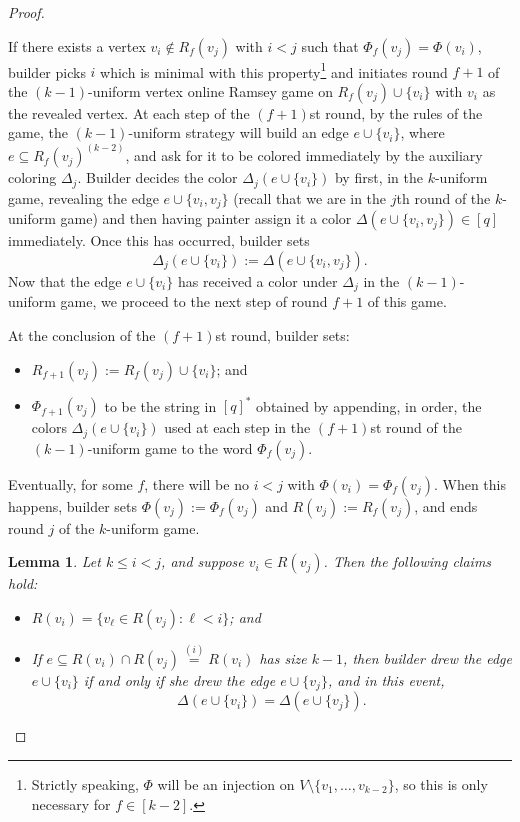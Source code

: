 \documentclass[10pt,a4paper]{amsart}
\newtheorem{lemma}{Lemma}
\def\l{\ell}
\begin{document}
\begin{proof}
\begin{itemize}
    If there exists a vertex $v_i \notin R_f(v_j)$ with $i < j$ such that $\Phi_f(v_j) = \Phi(v_i)$,
    builder picks $i$ which is minimal with this property\footnote{Strictly speaking, $\Phi$ will be an injection on $V \setminus \{v_1, \dots, v_{k-2}\}$, so this is only necessary for $f \in [k-2]$.}
    and initiates round $f+1$ of the $(k-1)$-uniform vertex online Ramsey game on $R_f(v_j) \cup \{v_i\}$ with $v_i$ as the revealed vertex.
    At each step of the $(f+1)$st round, by the rules of the game, the $(k-1)$-uniform strategy will build an edge $e \cup \{v_i\}$, where $e \subseteq R_f(v_j)^{(k-2)}$, and ask for it to be colored immediately by the auxiliary coloring $\Delta_j$.
    Builder decides the color $\Delta_j(e \cup \{v_i\})$ by first, in the $k$-uniform game, revealing the edge $e \cup \{v_i, v_j\}$ (recall that we are in the $j$th round of the $k$-uniform game) and then having painter assign it a color $\Delta(e \cup \{v_i,v_j\}) \in [q]$ immediately.
    Once this has occurred, builder sets
    \begin{equation*}
        \Delta_j(e \cup \{v_i\}) := \Delta(e \cup \{v_i, v_j\}).
    \end{equation*}
    Now that the edge $e \cup \{v_i\}$ has received a color under $\Delta_j$ in the $(k-1)$-uniform game, we proceed to the next step of round $f+1$ of this game.

    At the conclusion of the $(f+1)$st round, builder sets:
    \begin{itemize}
        \item $R_{f+1}(v_j) := R_f(v_j) \cup \{v_i\}$; and
        \item $\Phi_{f+1}(v_j)$ to be the string in $[q]^*$ obtained by appending, in order, the colors $\Delta_j(e \cup \{v_i\})$ used at each step in the $(f+1)$st round of the $(k-1)$-uniform game to the word $\Phi_f(v_j)$.
    \end{itemize}

    Eventually, for some $f$, there will be no $i < j$ with $\Phi(v_i) = \Phi_f(v_j)$.
    When this happens, builder sets $\Phi(v_j) := \Phi_f(v_j)$ and $R(v_j) := R_f(v_j)$, and ends round $j$ of the $k$-uniform game.
\end{itemize}

\begin{lemma}
\label{lem: main}
    Let $k \leq i < j$, and suppose $v_i \in R(v_j)$.
    Then the following claims hold:
    \begin{itemize}
        \item[(i)] $R(v_i) = \{v_\l \in R(v_j): \l < i\}$; and
        \item[(ii)] If $e \subseteq R(v_i) \cap R(v_j) \overset{(i)}{=} R(v_i)$ has size $k-1$, then builder drew the edge $e \cup \{v_i\}$ if and only if she drew the edge $e \cup \{v_j\}$, and in this event,
        \begin{equation*}
            \Delta(e \cup \{v_i\}) = \Delta(e \cup \{v_j\}). 
        \end{equation*}
    \end{itemize}
\end{lemma}


\end{proof}
\end{document}
